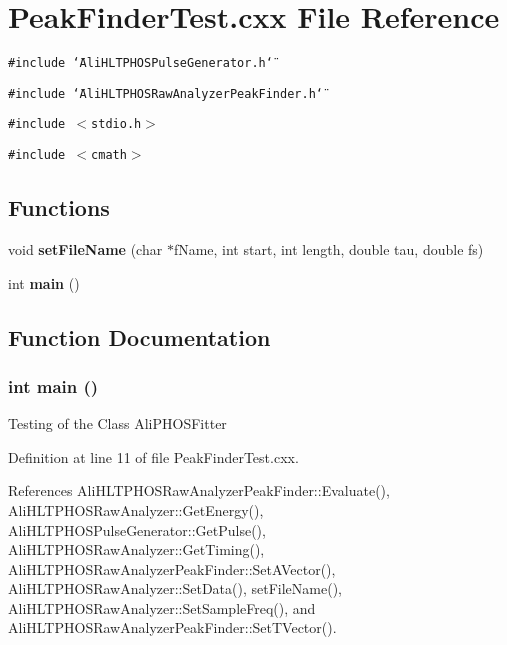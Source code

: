 \section{Peak\-Finder\-Test.cxx File Reference}
\label{PeakFinderTest_8cxx}


{\tt \#include \char`\"{}Ali\-HLTPHOSPulse\-Generator.h\char`\"{}}\par
{\tt \#include \char`\"{}Ali\-HLTPHOSRaw\-Analyzer\-Peak\-Finder.h\char`\"{}}\par
{\tt \#include $<$stdio.h$>$}\par
{\tt \#include $<$cmath$>$}\par
\subsection*{Functions}
\begin{CompactItemize}
\item 
void {\bf set\-File\-Name} (char $\ast$f\-Name, int start, int length, double tau, double fs)
\item 
int {\bf main} ()
\end{CompactItemize}


\subsection{Function Documentation}
\subsubsection{\setlength{\rightskip}{0pt plus 5cm}int main ()}\label{PeakFinderTest_8cxx_a1}


Testing of the Class Ali\-PHOSFitter 

Definition at line 11 of file Peak\-Finder\-Test.cxx.

References Ali\-HLTPHOSRaw\-Analyzer\-Peak\-Finder::Evaluate(), Ali\-HLTPHOSRaw\-Analyzer::Get\-Energy(), Ali\-HLTPHOSPulse\-Generator::Get\-Pulse(), Ali\-HLTPHOSRaw\-Analyzer::Get\-Timing(), Ali\-HLTPHOSRaw\-Analyzer\-Peak\-Finder::Set\-AVector(), Ali\-HLTPHOSRaw\-Analyzer::Set\-Data(), set\-File\-Name(), Ali\-HLTPHOSRaw\-Analyzer::Set\-Sample\-Freq(), and Ali\-HLTPHOSRaw\-Analyzer\-Peak\-Finder::Set\-TVector().


